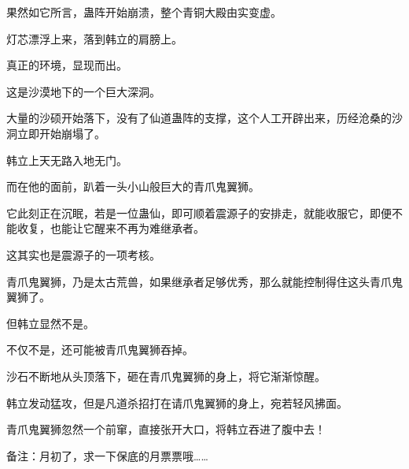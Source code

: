 \begin{this_body}
果然如它所言，蛊阵开始崩溃，整个青铜大殿由实变虚。

灯芯漂浮上来，落到韩立的肩膀上。

真正的环境，显现而出。

这是沙漠地下的一个巨大深洞。

大量的沙硕开始落下，没有了仙道蛊阵的支撑，这个人工开辟出来，历经沧桑的沙洞立即开始崩塌了。

韩立上天无路入地无门。

而在他的面前，趴着一头小山般巨大的青爪鬼翼狮。

它此刻正在沉眠，若是一位蛊仙，即可顺着震源子的安排走，就能收服它，即便不能收复，也能让它醒来不再为难继承者。

这其实也是震源子的一项考核。

青爪鬼翼狮，乃是太古荒兽，如果继承者足够优秀，那么就能控制得住这头青爪鬼翼狮了。

但韩立显然不是。

不仅不是，还可能被青爪鬼翼狮吞掉。

沙石不断地从头顶落下，砸在青爪鬼翼狮的身上，将它渐渐惊醒。

韩立发动猛攻，但是凡道杀招打在请爪鬼翼狮的身上，宛若轻风拂面。

青爪鬼翼狮忽然一个前窜，直接张开大口，将韩立吞进了腹中去！

备注：月初了，求一下保底的月票票哦……

\end{this_body}

